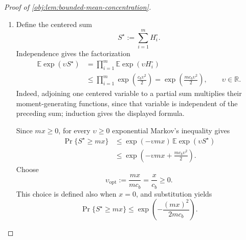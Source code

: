 \documentclass[11pt]{article}
\begin{document}
\begin{proof}[Proof of \cref{obj:lem:bounded-mean-concentration}]
\begin{enumerate}
The interval bound persists under the tilt. Consequently,
\[
\begin{aligned}
0
&\le
\mathbb E_{\upsilon}^{(i)}
\bigl[(u_i^\circ-H_i^\circ)(H_i^\circ-\ell_i^\circ)\bigr]\\
&=
-\mathbb E_{\upsilon}^{(i)}[(H_i^\circ)^2]
+(u_i^\circ+\ell_i^\circ)\bar h_{i,\upsilon}
-u_i^\circ\ell_i^\circ.
\end{aligned}
\]
Subtracting the squared tilted mean yields
\[
\begin{aligned}
\psi_i''(\upsilon)
&\le
(u_i^\circ-\bar h_{i,\upsilon})
(\bar h_{i,\upsilon}-\ell_i^\circ)\\
&=
\left(\frac{u_i^\circ-\ell_i^\circ}{2}\right)^2
-
\left(\bar h_{i,\upsilon}
-\frac{u_i^\circ+\ell_i^\circ}{2}\right)^2
\le c_b.
\end{aligned}
\]
For \(\upsilon>0\), Taylor's theorem supplies an intermediate point
\[
\upsilon_{i,\mathrm{mid}}\in(0,\upsilon),
\qquad
\psi_i(\upsilon)
=
\frac{\upsilon^2}{2}\psi_i''(\upsilon_{i,\mathrm{mid}})
\le\frac{c_b\upsilon^2}{2}.
\]
Thus \(\Phi_i(\upsilon)\le\exp(c_b\upsilon^2/2)\) for positive \(\upsilon\); at zero both sides equal one. For negative \(\upsilon\), apply the same positive-parameter calculation to the centered variable \(-H_i^\circ\), whose interval has the same width:
\[
-u_i^\circ\le-H_i^\circ\le-\ell_i^\circ,
\qquad
\mathbb E[-H_i^\circ]=0.
\]
It follows that
\[
\Phi_i(\upsilon)
=
\mathbb E\exp\bigl((-\upsilon)(-H_i^\circ)\bigr)
\le
\exp\left(\frac{c_b(-\upsilon)^2}{2}\right).
\]
We have therefore established
\[
\mathbb E\exp(\upsilon H_i^\circ)
\le\exp\left(\frac{c_b\upsilon^2}{2}\right),
\qquad \upsilon\in\mathbb R,\quad i=1,\ldots,m.
\]

\item
Define the centered sum
\[
S^\star:=\sum_{i=1}^m H_i^\circ.
\]
Independence gives the factorization
\[
\begin{aligned}
\mathbb E\exp(\upsilon S^\star)
&=\prod_{i=1}^m\mathbb E\exp(\upsilon H_i^\circ)\\
&\le
\prod_{i=1}^m\exp\left(\frac{c_b\upsilon^2}{2}\right)
=
\exp\left(\frac{mc_b\upsilon^2}{2}\right),
\qquad \upsilon\in\mathbb R.
\end{aligned}
\]
Indeed, adjoining one centered variable to a partial sum multiplies their moment-generating functions, since that variable is independent of the preceding sum; induction gives the displayed formula.

Since \(mx\ge0\), for every \(\upsilon\ge0\) exponential Markov's inequality gives
\[
\begin{aligned}
\Pr\{S^\star\ge mx\}
&\le
\exp(-\upsilon mx)\,\mathbb E\exp(\upsilon S^\star)\\
&\le
\exp\left(-\upsilon mx+\frac{mc_b\upsilon^2}{2}\right).
\end{aligned}
\]
Choose
\[
\upsilon_{\mathrm{opt}}:=\frac{mx}{mc_b}=\frac{x}{c_b}\ge0.
\]
This choice is defined also when \(x=0\), and substitution yields
\[
\Pr\{S^\star\ge mx\}
\le
\exp\left(-\frac{(mx)^2}{2mc_b}\right).
\]


\end{enumerate}
\end{proof}
\end{document}
